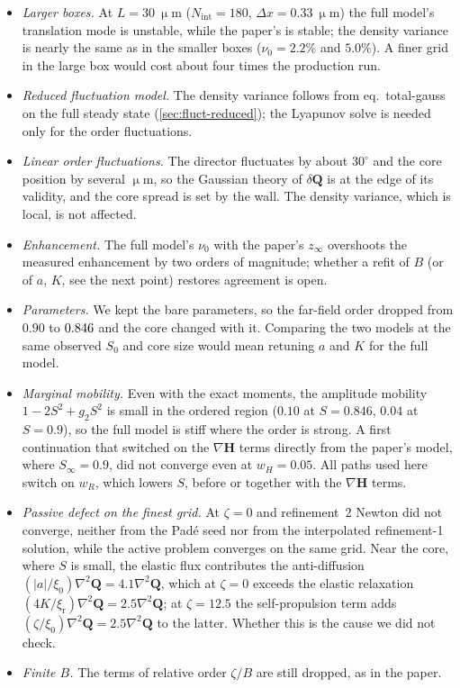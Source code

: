 \documentclass[11pt,a4paper]{article}
\newcommand{\upd}[1]{{\color{OliveGreen}#1}}
\newcommand{\Q}{\mathbf{Q}}
\renewcommand{\H}{\mathbf{H}}
\newcommand{\xir}{\xi_\mathrm{r}}
\newcommand{\micron}{\upmu\mathrm{m}}
\begin{document}
\begin{itemize}
  \item \emph{Larger boxes.} At $L=30~\micron$ ($N_\mathrm{int}=180$, $\Delta x=0.33~\micron$) the
    full model's translation mode is unstable, while the paper's is stable; the density variance
    is nearly the same as in the smaller boxes ($\nu_0=2.2\%$ and $5.0\%$). A finer grid in the
    large box would cost about four times the production run.
  \item {\color{OliveGreen}\emph{Reduced fluctuation model.} The density variance follows from
    eq.~total-gauss on the full steady state (\cref{sec:fluct-reduced}); the Lyapunov solve is
    needed only for the order fluctuations.}
  \item \emph{Linear order fluctuations.} The director fluctuates by about $30^\circ$ and the core
    position by several $\micron$, so the Gaussian theory of $\delta\Q$ is at the edge of its
    validity, and the core spread is set by the wall. The density variance, which is local, is
    not affected.
  \item \emph{Enhancement.} The full model's $\nu_0$ with the paper's $z_\infty$ overshoots the
    measured enhancement by two orders of magnitude; whether a refit of $B$ (or of $a$, $K$,
    see the next point) restores agreement is open.
  \item \emph{Parameters.} We kept the bare parameters, so the far-field order dropped from
    $0.90$ to $0.846$ and the core changed with it. Comparing the two models at
    the same observed $S_0$ and core size would mean retuning $a$ and $K$ for the full model.
  \item \emph{Marginal mobility.} Even with the exact moments, the amplitude mobility
    $1-2S^2+g_2S^2$ is small in the ordered region ($0.10$ at $S=0.846$, $0.04$ at
    $S=0.9$), so the full model is stiff where the order is strong. A first continuation that
    switched on \upd{the $\nabla\H$ terms} directly from the paper's model, where $S_\infty=0.9$,
    did not converge even at $w_H=0.05$. All paths used here switch on $w_R$, which lowers $S$,
    before or together with \upd{the $\nabla\H$ terms}.
  \item \emph{Passive defect on the finest grid.} At $\zeta=0$ and refinement~2 Newton did
    not converge, neither from the Pad\'e seed nor from the interpolated refinement-1
    solution, while the active problem converges on the same grid. Near the core, where $S$ is
    small, the elastic flux contributes the anti-diffusion $(|a|/\xi_0)\nabla^2\Q=4.1\nabla^2\Q$,
    which at $\zeta=0$ exceeds the elastic relaxation $(4K/\xir)\nabla^2\Q=2.5\nabla^2\Q$; at
    $\zeta=12.5$ the self-propulsion term adds $(\zeta/\xi_0)\nabla^2\Q=2.5\nabla^2\Q$ to the
    latter. Whether this is the cause we did not check.
  \item \emph{Finite $B$.} The terms of relative order $\zeta/B$ are still dropped, as in the
    paper.
\end{itemize}
\end{document}
